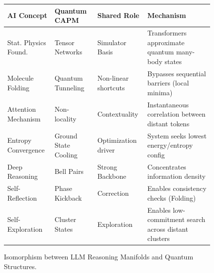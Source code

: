 \documentclass[11pt, a4paper]{article}
\begin{document}
\begin{figure}[H] 
\centering
\small
\renewcommand{\arraystretch}{1.3} 
\setlength{\tabcolsep}{6pt}
\begin{tabularx}{\textwidth}{|l|l|>{\RaggedRight}X|>{\RaggedRight}X|}
\hline
\textbf{AI Concept} & \textbf{Quantum CAPM} & \textbf{Shared Role} & \textbf{Mechanism} \\
\hline
Stat. Physics Found. & Tensor Networks & Simulator Basis & Transformers approximate quantum many-body states \cite{levine2021} \\
\hline
Molecule Folding & Quantum Tunneling & Non-linear shortcuts & Bypasses sequential barriers (local minima) \\
\hline
Attention Mechanism & Non-locality & Contextuality & Instantaneous correlation between distant tokens \\
\hline
Entropy Convergence & Ground State Cooling & Optimization driver & System seeks lowest energy/entropy config \\
\hline
Deep Reasoning & Bell Pairs & Strong Backbone & Concentrates information density \cite{nielsen2010} \\
\hline
Self-Reflection & Phase Kickback & Correction & Enables consistency checks (Folding) \\
\hline
Self-Exploration & Cluster States & Exploration & Enables low-commitment search across distant clusters \cite{raussendorf2001} \\
\hline
\end{tabularx}
\caption{Isomorphism between LLM Reasoning Manifolds and Quantum Structures.}
\label{fig:isomorphism}
\end{figure}
\end{document}
